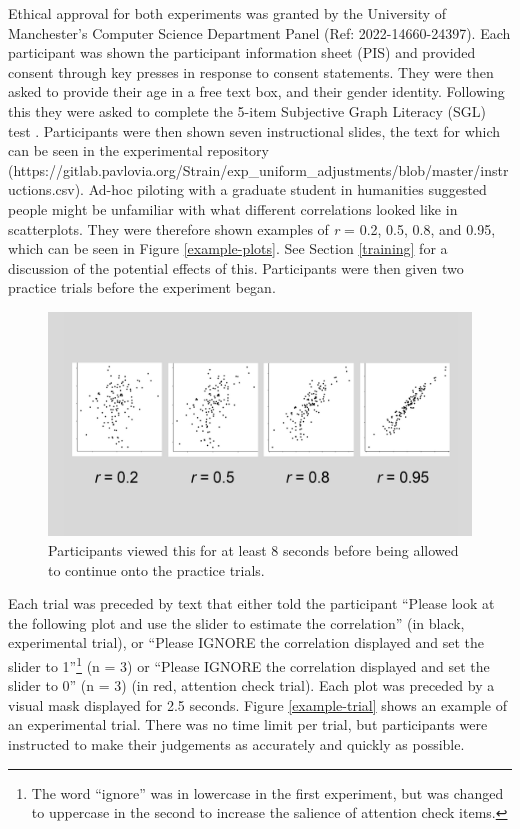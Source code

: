 \documentclass[preprint, 3p,
authoryear]{elsarticle} %
\begin{document}
Ethical approval for both experiments was granted by the University of
Manchester's Computer Science Department Panel (Ref: 2022-14660-24397).
Each participant was shown the participant information sheet (PIS) and
provided consent through key presses in response to consent statements.
They were then asked to provide their age in a free text box, and their
gender identity. Following this they were asked to complete the 5-item
Subjective Graph Literacy (SGL) test \citep{garcia_2016}. Participants
were then shown seven instructional slides, the text for which can be
seen in the experimental repository
(https://gitlab.pavlovia.org/Strain/exp\_uniform\_adjustments/blob/master/instructions.csv).
Ad-hoc piloting with a graduate student in humanities suggested people
might be unfamiliar with what different correlations looked like in
scatterplots. They were therefore shown examples of \emph{r} = 0.2, 0.5,
0.8, and 0.95, which can be seen in Figure \ref{example-plots}. See
Section \ref{training} for a discussion of the potential effects of
this. Participants were then given two practice trials before the
experiment began.

\begin{figure}

\includegraphics[width=0.5\linewidth]{images/example-plots} \hfill{}

\caption{\label{example-plots}Participants viewed this for at least 8 seconds before being allowed to continue onto the practice trials.}\label{fig:example-plots}
\end{figure}

Each trial was preceded by text that either told the participant
``Please look at the following plot and use the slider to estimate the
correlation'' (in black, experimental trial), or ``Please IGNORE the
correlation displayed and set the slider to 1''\footnote{The word
  ``ignore'' was in lowercase in the first experiment, but was changed
  to uppercase in the second to increase the salience of attention check
  items.} (n = 3) or ``Please IGNORE the correlation displayed and set
the slider to 0'' (n = 3) (in red, attention check trial). Each plot was
preceded by a visual mask displayed for 2.5 seconds. Figure
\ref{example-trial} shows an example of an experimental trial. There was
no time limit per trial, but participants were instructed to make their
judgements as accurately and quickly as possible.
\end{document}
